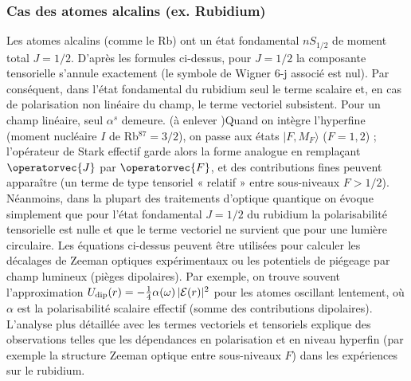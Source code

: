 \subsubsection{Cas des atomes alcalins (ex. Rubidium)}

Les atomes alcalins (comme le Rb) ont un état fondamental $nS_{1/2}$ de moment total $J=1/2$. D’après les formules ci-dessus, pour $J=1/2$ la composante tensorielle s’annule exactement (le symbole de Wigner 6-j associé est nul). Par conséquent, dans l’état fondamental du rubidium seul le terme scalaire et, en cas de polarisation non linéaire du champ, le terme vectoriel subsistent. Pour un champ linéaire, seul $\alpha^s$ demeure. {\color{red} (à enlever )Quand on intègre l’hyperfine (moment nucléaire $I$ de Rb$^{87}=3/2$), on passe aux états $|F,M_F\rangle$ ($F=1,2$) ; l’opérateur de Stark effectif garde alors la forme analogue en remplaçant $\operatorvec{J}$ par $\operatorvec{F}$, et des contributions fines peuvent apparaître (un terme de type tensoriel « relatif » entre sous-niveaux $F>1/2$). Néanmoins, dans la plupart des traitements d’optique quantique on évoque simplement que pour l’état fondamental $J=1/2$ du rubidium la polarisabilité tensorielle est nulle et que le terme vectoriel ne survient que pour une lumière circulaire. Les équations ci-dessus peuvent être utilisées pour calculer les décalages de Zeeman optiques expérimentaux ou les potentiels de piégeage par champ lumineux (pièges dipolaires). Par exemple, on trouve souvent l’approximation $U_{\rm dip}(r)=-\frac{1}{4}\alpha(\omega)\,|\mathcal{E}(r)|^2$ pour les atomes oscillant lentement, où $\alpha$ est la polarisabilité scalaire effectif (somme des contributions dipolaires). L’analyse plus détaillée avec les termes vectoriels et tensoriels explique des observations telles que les dépendances en polarisation et en niveau hyperfin (par exemple la structure Zeeman optique entre sous-niveaux $F$) dans les expériences sur le rubidium.}
